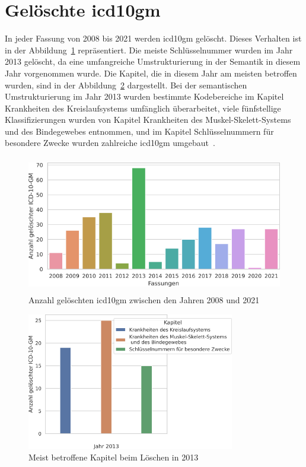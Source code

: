\section{Gelöschte \acs{icd10gm}} \label{sec:deletedicd}

In jeder Fassung von 2008 bis 2021 werden \ac{icd10gm} gelöscht. Dieses Verhalten ist in der Abbildung~\ref{fig:newdeleteoldicdyear} repräsentiert. Die meiste Schlüsselnummer wurden im Jahr 2013 gelöscht, da eine umfangreiche Umstrukturierung in der Semantik in diesem Jahr vorgenommen wurde. Die Kapitel, die in diesem Jahr am meisten betroffen wurden, sind in der Abbildung~\ref{fig:kap13} dargestellt. Bei der semantischen Umstrukturierung im Jahr 2013 wurden bestimmte Kodebereiche im Kapitel \textsf{Krankheiten des Kreislaufsystems} umfänglich überarbeitet, viele fünfstellige Klassifizierungen wurden von Kapitel \textsf{Krankheiten des Muskel-Skelett-Systems und des Bindegewebes} entnommen, und im Kapitel \textsf{Schlüsselnummern für besondere Zwecke} wurden zahlreiche \ac{icd10gm} umgebaut~\cite{dele13}.

\begin{figure}[ht]
	\centering
	\includegraphics[height=6cm]{figures/neuVersionDelete}
	\caption[Gelöschte \acs{icd10gm} pro Jahr]{Anzahl gelöschten \acs{icd10gm} zwischen den Jahren 2008 und 2021}
	\label{fig:newdeleteoldicdyear}
\end{figure} 

\clearpage

\begin{figure}[ht]
	\centering
	\includegraphics[height=6cm]{figures/kaptnr13}
	\caption{Meist betroffene Kapitel beim Löschen in 2013}
	\label{fig:kap13}
\end{figure}


